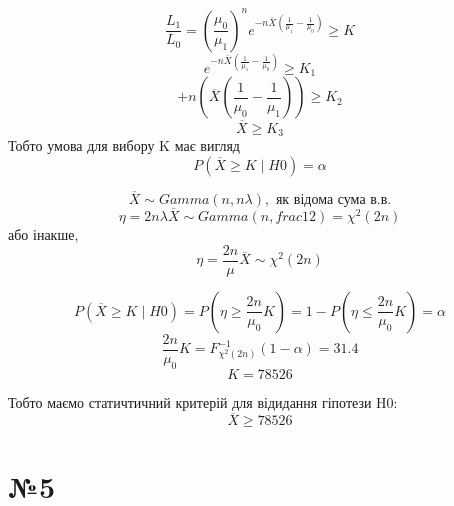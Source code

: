 \documentclass[11pt, a4paper]{article} %
\begin{document}
$$\frac{L_1}{L_0} = \left(\frac{\mu_0}{\mu_1}\right)^n e^{-n \overline X \left(\frac{1}{\mu_1} - \frac{1}{\mu_0}\right)} \ge K$$
$$e^{-n \overline X \left(\frac{1}{\mu_1} - \frac{1}{\mu_0}\right)} \ge K_1$$
$$+n \left(\overline X \left(\frac{1}{\mu_0} - \frac{1}{\mu_1}\right)\right) \ge K_2$$
$$\overline X \ge K_3$$
Тобто умова для вибору K має вигляд
$$P(\overline X \ge K \;|\; H0) = \alpha$$

$$\overline X \sim Gamma(n, n \lambda), \text{ як відома сума в.в.}$$
$$\eta = 2 n \lambda \overline X \sim Gamma(n, frac{1}{2}) = \chi^2(2n)$$
або інакше,
$$\eta = \frac{2n}{\mu} \overline X \sim \chi^2(2n)$$

$$P(\overline X \ge K \;|\; H0) = P(\eta \ge \frac{2n}{\mu_0} K) = 1 - P(\eta \le \frac{2n}{\mu_0} K) = \alpha$$
$$\frac{2n}{\mu_0} K = F_{\chi^2(2n)}^{-1}(1-\alpha) = 31.4$$
$$K = 78526$$

\begin{mdframed}[style=ans]
    Тобто маємо статичтичний критерій для відидання гіпотези H0:
    $$\overline X \ge 78526$$
\end{mdframed}


\section*{№5}
\end{document}
